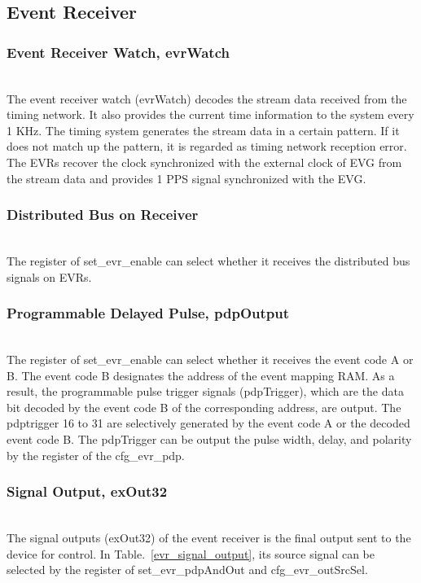\documentclass[journal,reqno]{IEEEtran}
\begin{document}
\subsection{Event Receiver}
\subsubsection{Event Receiver Watch, evrWatch}\hspace*{\fill} \\
The event receiver watch (evrWatch) decodes the stream data received from the timing network. It also provides the current time information to the system every 1 KHz.
The timing system generates the stream data in a certain pattern. If it does not match up the pattern, it is regarded as timing network reception error. The EVRs recover the clock synchronized with the external clock of EVG from the stream data and provides 1 PPS signal synchronized with the EVG.\newline

\subsubsection{Distributed Bus on Receiver }\hspace*{\fill} \\
The register of set\_evr\_enable can select whether it receives the distributed bus signals on EVRs. \newline

\subsubsection{Programmable Delayed Pulse, pdpOutput}\hspace*{\fill} \\
The register of set\_evr\_enable can select whether it receives the event code A or B. The event code B designates the address of the event mapping RAM. As a result, the programmable pulse trigger signals (pdpTrigger), which are the data bit decoded by the event code B of the corresponding address, are output. The pdptrigger 16 to 31 are selectively generated by the event code A or the decoded event code B. The pdpTrigger can be output the pulse width, delay, and polarity by the register of the cfg\_evr\_pdp.\newline

\subsubsection{Signal Output, exOut32}\hspace*{\fill} \\
The signal outputs (exOut32) of the event receiver is the final output sent to the device for control. In Table.~\ref*{evr_signal_output}, its source signal can be selected by the register of set\_evr\_pdpAndOut and cfg\_evr\_outSrcSel.\newline
\end{document}
